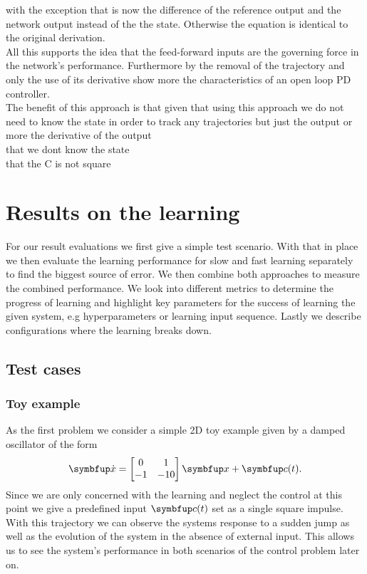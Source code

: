 with the exception that is now the difference of the reference output and the network output instead of the the state. Otherwise the equation is identical to the original derivation. \\

All this supports the idea that the feed-forward inputs are the governing force in the network's performance. Furthermore by the removal of the trajectory and only the use of its derivative show more the characteristics of an open loop PD controller.\\
The benefit of this approach is that given that using this approach we do not need to know the state in order to track any trajectories but just the output or more the derivative of the output\\
that we dont know the state\\
that the C is not square


\section{Results on the learning}


For our result evaluations we first give a simple test scenario. With that in place we then evaluate the learning performance for slow and fast learning separately to find the biggest source of error. We then combine both approaches to measure the combined performance. We look into different metrics to determine the progress of learning and highlight key parameters for the success of learning the given system, e.g hyperparameters or learning input sequence. Lastly we describe configurations where the learning breaks down.\\


\subsection{Test cases}
\subsubsection{Toy example}
As the first problem we consider a simple 2D toy example given by a damped oscillator of the form
\begin{equation}
	\bmu{\dot{x}} = \begin{bmatrix}
	0&1\\ -1 &-10
	\end{bmatrix}\bmu{x} + \bmu{c}(t).
\end{equation}
Since we are only concerned with the learning and neglect the control at this point we give a predefined input $\bmu{c}(t)$ set as a single square impulse. With this trajectory we can observe the systems response to a sudden jump as well as the evolution of the system in the absence of external input. This allows us to see the system's performance in both scenarios of the control problem later on.

